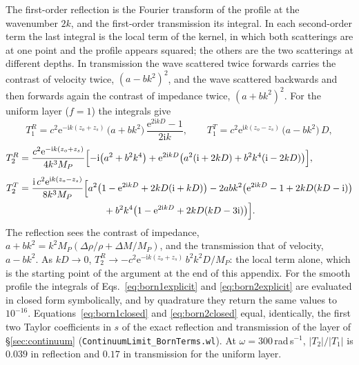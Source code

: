 \documentclass[11pt,a4paper]{article}
\newcommand{\nb}[1]{\texttt{#1}}
\begin{document}
The first-order reflection is the Fourier transform of the profile at the wavenumber $2k$, and the
first-order transmission its integral. In each second-order term the last integral is the local term of
the kernel, in which both scatterings are at one point and the profile appears squared; the others are
the two scatterings at different depths. In transmission the wave scattered twice forwards carries the
contrast of velocity twice, $(a-bk^2)^2$, and the wave scattered backwards and then forwards again the
contrast of impedance twice, $(a+bk^2)^2$. For the uniform layer ($f=1$) the integrals give
\begin{equation}\label{eq:born1closed}
  T_1^{R}=c^2\mathrm{e}^{-\mathrm{i}k(z_o+z_s)}\,\bigl(a+bk^2\bigr)\,
          \frac{\mathrm{e}^{2\mathrm{i}kD}-1}{2\mathrm{i}k},
  \qquad
  T_1^{T}=c^2\mathrm{e}^{\mathrm{i}k(z_o-z_s)}\,\bigl(a-bk^2\bigr)\,D,
\end{equation}
\begin{equation}\label{eq:born2closed}
\begin{aligned}
  T_2^{R}&=\frac{c^2\mathrm{e}^{-\mathrm{i}k(z_o+z_s)}}{4k^3M_P}
     \Bigl[-\mathrm{i}\bigl(a^2+b^2k^4\bigr)
     +\mathrm{e}^{2\mathrm{i}kD}\bigl(a^2(\mathrm{i}+2kD)+b^2k^4(\mathrm{i}-2kD)\bigr)\Bigr],\\[4pt]
  T_2^{T}&=\frac{\mathrm{i}\,c^2\mathrm{e}^{\mathrm{i}k(z_o-z_s)}}{8k^3M_P}
     \Bigl[a^2\bigl(1-\mathrm{e}^{2\mathrm{i}kD}+2kD(\mathrm{i}+kD)\bigr)
     -2abk^2\bigl(\mathrm{e}^{2\mathrm{i}kD}-1+2kD(kD-\mathrm{i})\bigr)\\
     &\hspace{9em}+b^2k^4\bigl(1-\mathrm{e}^{2\mathrm{i}kD}+2kD(kD-3\mathrm{i})\bigr)\Bigr].
\end{aligned}
\end{equation}
The reflection sees the contrast of impedance, $a+bk^2=k^2M_P(\Delta\rho/\rho+\Delta M/M_P)$, and the
transmission that of velocity, $a-bk^2$. As $kD\to0$, $T_2^{R}\to-c^2\mathrm{e}^{-\mathrm{i}k(z_o+z_s)}\,
b^2k^2D/M_P$: the local term alone, which is the starting point of the argument at the end of this appendix. For the smooth
profile the integrals of Eqs.~\eqref{eq:born1explicit} and \eqref{eq:born2explicit} are evaluated in
closed form symbolically, and by quadrature they return the same values to $10^{-16}$.
Equations~\eqref{eq:born1closed} and \eqref{eq:born2closed} equal, identically, the first two Taylor
coefficients in $s$ of the exact
reflection and transmission of the layer of \S\ref{sec:continuum} (\nb{ContinuumLimit\_BornTerms.wl}).
At $\omega=300$\,rad\,s$^{-1}$, $\lvert T_2\rvert/\lvert T_1\rvert$ is $0.039$ in reflection and $0.17$
in transmission for the uniform layer.
\end{document}
